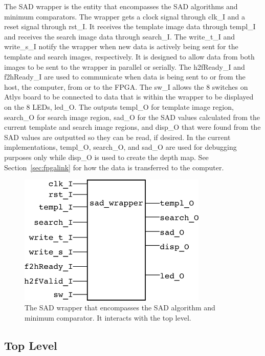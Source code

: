 The SAD wrapper is the entity that encompasses the SAD algorithms and minimum comparators. The wrapper gets a clock signal through clk\_I and a reset signal through rst\_I. It receives the template image data through templ\_I and receives the search image data through search\_I. The write\_t\_I and write\_s\_I notify the wrapper when new data is actively being sent for the template and search images, respectively. It is designed to allow data from both images to be sent to the wrapper in parallel or serially. The h2fReady\_I and f2hReady\_I are used to communicate when data is being sent to or from the host, the computer, from or to the FPGA. The sw\_I allows the 8 switches on Atlys board to be connected to data that is within the wrapper to be displayed on the 8 LEDs, led\_O. The outputs templ\_O for template image region, search\_O for search image region, sad\_O for the SAD values calculated from the current template and search image regions, and disp\_O that were found from the SAD values are outputted so they can be read, if desired. In the current implementations, templ\_O, search\_O, and sad\_O are used for debugging purposes only while disp\_O is used to create the depth map. See Section~\ref{sec:fpgalink} for how the data is transferred to the computer.

\begin{figure}[h]
	\begin{center}
		\includegraphics[width=90mm]{figures/sad_wrapper_rtl.png}
		\captionfonts
		\caption{The SAD wrapper that encompasses the SAD algorithm and minimum comparator. It interacts with the top level.}
		\label{fig:sadWrapper_rtl}
	\end{center}
\end{figure}

\subsection{Top Level}

